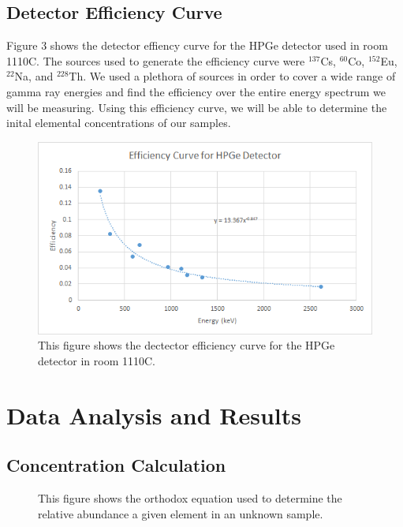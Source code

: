 \documentclass[]{article}
\begin{document}
\pagebreak


\subsection{Detector Efficiency Curve}

Figure 3 shows the detector effiency curve for the HPGe detector used in room 1110C. The sources used to generate the efficiency curve were $^{137}$Cs, $^{60}$Co, $^{152}$Eu, $^{22}$Na, and $^{228}$Th. We used a plethora of sources in order to cover a wide range of gamma ray energies and find the efficiency over the entire energy spectrum we will be measuring. Using this efficiency curve, we will be able to determine the inital elemental concentrations of our samples.


\begin{figure}[h]
\centering
\includegraphics[scale=0.6]{Efficiency}
\caption{This figure shows the dectector efficiency curve for the HPGe detector in room 1110C.}
\end{figure} 

\pagebreak
 

\section{Data Analysis and Results}
\subsection{Concentration Calculation}

\begin{figure}[h]
\centering
{}
\caption{This figure shows the orthodox equation used to determine the relative abundance a given element in an unknown sample.}
\end{figure}
\end{document}

